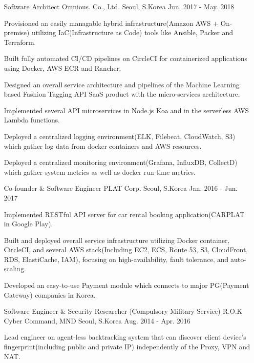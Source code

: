 \begin{cventries}
  \cventry
  {Software Architect} %
  {Omnious. Co., Ltd.} %
  {Seoul, S.Korea} %
  {Jun. 2017 - May. 2018} %
  {
    \begin{cvitems} %
      \item {Provisioned an easily managable hybrid infrastructure(Amazon AWS + On-premise) utilizing IaC(Infrastructure as Code) tools like Ansible, Packer and Terraform.}
      \item {Built fully automated CI/CD pipelines on CircleCI for containerized applications using Docker, AWS ECR and Rancher.}
      \item {Designed an overall service architecture and pipelines of the Machine Learning based Fashion Tagging API SaaS product with the micro-services architecture.}
      \item {Implemented several API microservices in Node.js Koa and in the serverless AWS Lambda functions.}
      \item {Deployed a centralized logging environment(ELK, Filebeat, CloudWatch, S3) which gather log data from docker containers and AWS resources.}
      \item {Deployed a centralized monitoring environment(Grafana, InfluxDB, CollectD) which gather system metrics as well as docker run-time metrics.}
    \end{cvitems}
  }

  \cventry
  {Co-founder \& Software Engineer} %
  {PLAT Corp.} %
  {Seoul, S.Korea} %
  {Jan. 2016 - Jun. 2017} %
  {
    \begin{cvitems} %
      \item {Implemented RESTful API server for car rental booking application(CARPLAT in Google Play).}
      \item {Built and deployed overall service infrastructure utilizing Docker container, CircleCI, and several AWS stack(Including EC2, ECS, Route 53, S3, CloudFront, RDS, ElastiCache, IAM), focusing on high-availability, fault tolerance, and auto-scaling.}
      \item {Developed an easy-to-use Payment module which connects to major PG(Payment Gateway) companies in Korea.}
    \end{cvitems}
  }

  \cventry
  {Software Engineer \& Security Researcher (Compulsory Military Service)} %
  {R.O.K Cyber Command, MND} %
  {Seoul, S.Korea} %
  {Aug. 2014 - Apr. 2016} %
  {
    \begin{cvitems} %
      \item {Lead engineer on agent-less backtracking system that can discover client device's fingerprint(including public and private IP) independently of the Proxy, VPN and NAT.}
    \end{cvitems}
  }


\end{cventries}
